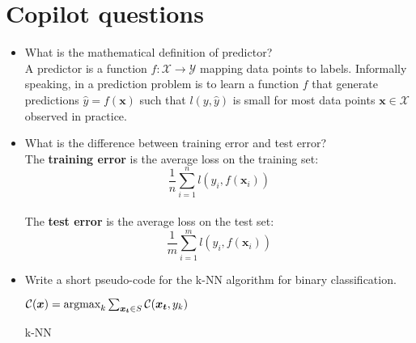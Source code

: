 \newpage
\section{Copilot questions}

\begin{itemize}
    \item What is the mathematical definition of predictor?\\

        A predictor is a function $f: \mathcal{X} \rightarrow \mathcal{Y}$ mapping data points to labels. Informally speaking, in a prediction problem is to learn a function $f$ that generate predictions $\hat{y} = f(\boldsymbol{x})$ such that $l(y, \hat{y})$ is small for most data points $\boldsymbol{x} \in \mathcal{X}$ observed in practice.\\

    \item What is the difference between training error and test error?\\

        The \textbf{training error} is the average loss on the training set: $$\frac{1}{n} \sum_{i=1}^n l(y_i, f(\boldsymbol{x}_i))$$\\
        The \textbf{test error} is the average loss on the test set: $$\frac{1}{m} \sum_{i=1}^m l(y_i, f(\boldsymbol{x}_i))$$ 
    
    \item Write a short pseudo-code for the k-NN algorithm for binary classification.\\
        
        \begin{algorithm}[H]
            \SetAlgoLined
            \DontPrintSemicolon
            $\mathcal{C}(\boldsymbol{x}) = \textmd{argmax}_{k}\sum_{\boldsymbol{x_{t}} \in S}\mathcal{C}(\boldsymbol{x_{t}}, y_{k})$
            \caption{k-NN}
        \end{algorithm}


\end{itemize}
